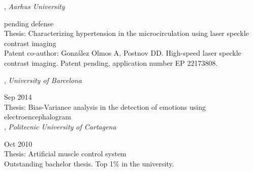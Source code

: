 
,
\textit{Aarhus University}\strut \hfill pending defense\\
Thesis: Characterizing hypertension in the microcirculation using laser speckle contrast imaging\\
Patent co-author: Gonz\'alez Olmos A, Postnov DD. High-speed laser speckle contrast imaging. Patent pending, application number EP 22173808.

,
\textit{University of Barcelona}\strut \hfill Sep 2014\\
Thesis: Bias-Variance analysis in the detection of emotions using electroencephalogram\\

,
\textit{Politecnic University of Cartagena}\strut \hfill Oct 2010\\
Thesis: Artificial muscle control system\\
Outstanding bachelor thesis. Top 1\% in the university.


